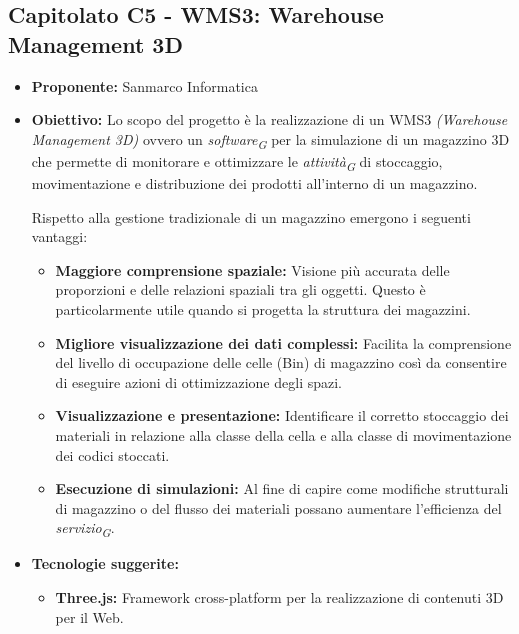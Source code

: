 \documentclass{article}
\begin{document}

\subsection{\textbf{Capitolato C5} - WMS3: Warehouse Management 3D}
\begin{itemize}
    \item[] \textbf{Proponente:} Sanmarco Informatica
        
    \item[] \textbf{Obiettivo:} Lo scopo del progetto è la realizzazione di un WMS3 \textit{(Warehouse Management 3D)} ovvero un \textit{software}\textsubscript{\textit{G}} per la simulazione di un magazzino 3D che permette di monitorare e ottimizzare le \textit{attività}\textsubscript{\textit{G}} di stoccaggio, movimentazione e distribuzione dei prodotti all'interno di un magazzino. 
    
    Rispetto alla gestione tradizionale di un magazzino emergono i seguenti vantaggi:
    \begin{itemize}
        \item \textbf{Maggiore comprensione spaziale:} Visione più accurata delle proporzioni e delle relazioni spaziali tra gli oggetti. Questo è particolarmente utile quando si progetta la struttura dei magazzini.
        \item \textbf{Migliore visualizzazione dei dati complessi:} Facilita la comprensione del livello di occupazione delle celle (Bin) di magazzino così da consentire di eseguire azioni di ottimizzazione degli spazi.
        \item \textbf{Visualizzazione e presentazione:} Identificare il corretto stoccaggio dei materiali in relazione alla classe della cella e alla classe di movimentazione dei codici stoccati. 
        \item \textbf{Esecuzione di simulazioni:} Al fine di capire come modifiche strutturali di magazzino o del flusso dei materiali possano aumentare l'efficienza del \textit{servizio}\textsubscript{\textit{G}}.
    \end{itemize}

    \item[] \textbf{Tecnologie suggerite:}
    \begin{itemize}
        \item \textbf{Three.js:} Framework cross-platform per la realizzazione di contenuti 3D per il Web.
    \end {itemize}


\end{itemize}
\end{document}
